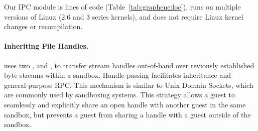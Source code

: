 Our IPC module is \gipclines{} lines of code (Table~\ref{tab:graphene:loc}), 
runs on multiple versions of Linux (2.6 and 3 series kernels), and
does not require
Linux kernel changes or recompilation.


\begin{comment}
A critical challenge in developing a Linux library OS was implementing 
handle inheritance in the guest.  In some cases, 
handles are easy to reproduce: an open file can simply be reopened in the child,
and the cursor offset adjusted (note that file handle offsets are a library abstraction
implemented over a memory mapped file).
Pipes, however, are not easily recreated without host support.
\end{comment}

\paragraph{Inheriting File Handles.}
\thelibos{} uses two \hostapis{},  and , to transfer 
stream handles out-of-band over reviously 
established byte streams within a sandbox.  Handle passing facilitates inheritance
and general-purpose RPC.
This mechanism is similar to Unix Domain Sockets,
which are commonly used by sandboxing systems. %
This strategy allows a guest to seamlessly and explicitly 
share an open handle with another guest in the same sandbox, but prevents
a guest from sharing a handle with a guest outside of the sandbox.

